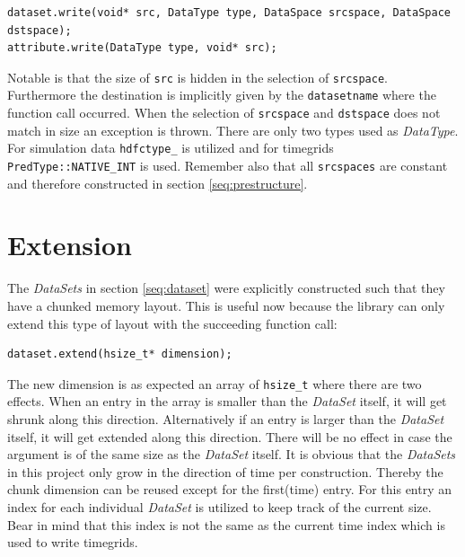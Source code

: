 \begin{lstlisting}
dataset.write(void* src, DataType type, DataSpace srcspace, DataSpace dstspace);
attribute.write(DataType type, void* src);
\end{lstlisting}
Notable is that the size of \texttt{src} is hidden in the selection of \texttt{srcspace}. Furthermore the destination is implicitly given by the \texttt{datasetname} where the function call occurred. When the selection of \texttt{srcspace} and \texttt{dstspace} does not match in size an exception is thrown. There are only two types used as \textit{DataType}. For simulation data \texttt{hdfctype\_} is utilized and for timegrids \texttt{PredType::NATIVE\_INT} is used. Remember also that all \texttt{srcspaces} are constant and therefore constructed in section \ref{seq:prestructure}.

\section{Extension}
\label{seq:extension}
The \textit{DataSets} in section \ref{seq:dataset} were explicitly constructed such that they have a chunked memory layout. This is useful now because the library can only extend this type of layout with the succeeding function call: 
\begin{lstlisting}
dataset.extend(hsize_t* dimension);
\end{lstlisting}
The new dimension is as expected an array of \texttt{hsize\_t} where there are two effects. When an entry in the array is smaller than the \textit{DataSet} itself, it will get shrunk along this direction. Alternatively if an entry is larger than the \textit{DataSet} itself, it will get extended along this direction. There will be no effect in case the argument is of the same size as the \textit{DataSet} itself. It is obvious that the \textit{DataSets} in this project only grow in the direction of time per construction. Thereby the chunk dimension can be reused except for the first(time) entry. For this entry an index for each individual \textit{DataSet} is utilized to keep track of the current size. Bear in mind that this index is not the same as the current time index which is used to write timegrids.

